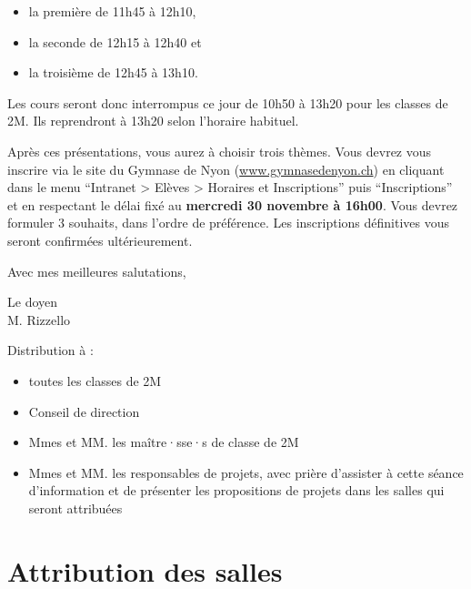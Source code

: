 \documentclass[
  10pt,
  french,
  a5paper,
  openany]{book}
\providecommand{\tightlist}{%
  \setlength{\itemsep}{0pt}\setlength{\parskip}{0pt}}
\newenvironment{signature}{\begin{flushright}}{\end{flushright}}
\begin{document}
\begin{itemize}
\tightlist
\item
  la première de 11h45 à 12h10,
\item
  la seconde de 12h15 à 12h40 et
\item
  la troisième de 12h45 à 13h10.
\end{itemize}

Les cours seront donc interrompus ce jour de 10h50 à 13h20 pour les classes de 2M. Ils reprendront à 13h20 selon l'horaire habituel.

\clearpage

Après ces présentations, vous aurez à choisir trois thèmes. Vous devrez vous inscrire via le site du Gymnase de Nyon (\url{www.gymnasedenyon.ch}) en cliquant dans le menu ``Intranet \textgreater{} Elèves \textgreater{} Horaires et Inscriptions'' puis ``Inscriptions'' et en respectant le délai fixé au \textbf{mercredi 30 novembre à 16h00}. Vous devrez formuler 3 souhaits, dans l'ordre de préférence. Les inscriptions définitives vous seront confirmées ultérieurement.

Avec mes meilleures salutations,

\begin{signature}
Le doyen\\
M. Rizzello

\end{signature}


Distribution à :

\begin{itemize}
\tightlist
\item
  toutes les classes de 2M
\item
  Conseil de direction
\item
  Mmes et MM. les maître·sse·s de classe de 2M
\item
  Mmes et MM. les responsables de projets, avec prière d'assister à cette séance d'information et de présenter les propositions de projets dans les salles qui seront attribuées
\end{itemize}

\hypertarget{attribution-des-salles}{%
\chapter*{Attribution des salles}\label{attribution-des-salles}}
\end{document}
